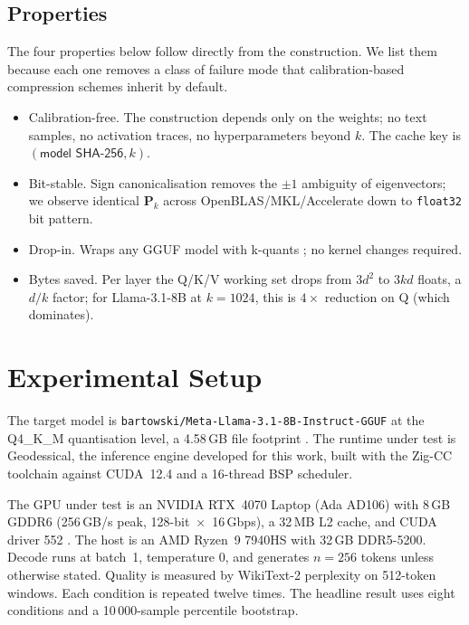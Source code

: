 \documentclass[11pt]{article}
\providecommand{\Pmat}{\mathbf{P}}
\begin{document}
\subsection{Properties}
The four properties below follow directly from the construction. We list
them because each one removes a class of failure mode that calibration-based
compression schemes inherit by default.

\begin{itemize}
\item Calibration-free. The construction depends only on the
weights; no text samples, no activation traces, no hyperparameters beyond
$k$.  The cache key is $(\textsf{model SHA-256}, k)$.
\item Bit-stable.  Sign canonicalisation removes the
$\pm1$ ambiguity of eigenvectors; we observe identical $\Pmat_k$ across
OpenBLAS/MKL/Accelerate down to \texttt{float32} bit pattern.
\item Drop-in.  Wraps any GGUF \cite{ggerganov2023gguf} model with
k-quants \cite{ggerganov2023kquants}; no kernel changes required.
\item Bytes saved.  Per layer the Q/K/V working set drops from
$3d^2$ to $3kd$ floats, a $d/k$ factor; for Llama-3.1-8B at $k{=}1024$, this
is $4\times$ reduction on Q (which dominates).
\end{itemize}
\FloatBarrier

\section{Experimental Setup}
\label{sec:setup}

The target model is \texttt{bartowski/Meta-Llama-3.1-8B-Instruct-GGUF} at
the Q4\_K\_M quantisation level, a 4.58\,GB file footprint
\cite{grattafiori2024llama3,ggerganov2023kquants}. The runtime under test
is Geodessical, the inference engine developed for this work, built with
the Zig-CC toolchain against CUDA~12.4 and a 16-thread BSP scheduler.

The GPU under test is an NVIDIA RTX~4070 Laptop (Ada AD106) with
8\,GB GDDR6 (256\,GB/s peak, 128-bit~$\times$~16\,Gbps), a 32\,MB L2
cache, and CUDA driver 552 \cite{nvidia2022ada}. The host is an AMD
Ryzen~9 7940HS with 32\,GB DDR5-5200. Decode runs at batch~1, temperature
$0$, and generates $n{=}256$ tokens unless otherwise stated. Quality is
measured by WikiText-2 perplexity \cite{merity2016wikitext} on 512-token
windows. Each condition is repeated twelve times. The headline result
uses eight conditions and a 10\,000-sample percentile bootstrap.
\end{document}
